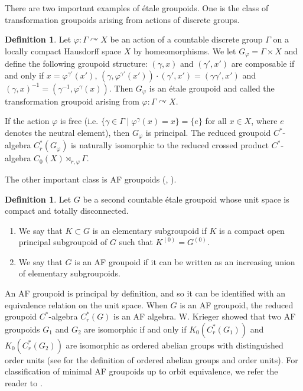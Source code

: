 \documentclass[11pt]{article}
\theoremstyle{definition}
\newtheorem{df}[thm]{Definition}
\renewcommand{\phi}{\varphi}
\begin{document}
There are two important examples of \'etale groupoids. 
One is the class of transformation groupoids 
arising from actions of discrete groups. 

\begin{df}
Let $\phi:\Gamma\curvearrowright X$ be 
an action of a countable discrete group $\Gamma$ 
on a locally compact Hausdorff space $X$ by homeomorphisms. 
We let $G_\phi=\Gamma\times X$ and define the following groupoid structure: 
$(\gamma,x)$ and $(\gamma',x')$ are composable 
if and only if $x=\phi^{\gamma'}(x')$, 
$(\gamma,\phi^{\gamma'}(x'))\cdot(\gamma',x')=(\gamma\gamma',x')$ and 
$(\gamma,x)^{-1}=(\gamma^{-1},\phi^\gamma(x))$. 
Then $G_\phi$ is an \'etale groupoid and 
called the transformation groupoid 
arising from $\phi:\Gamma\curvearrowright X$. 
\end{df}

If the action $\phi$ is free 
(i.e. $\{\gamma\in\Gamma\mid\phi^\gamma(x){=}x\}=\{e\}$ for all $x\in X$, 
where $e$ denotes the neutral element), then 
$G_\phi$ is principal. 
The reduced groupoid $C^*$-algebra $C^*_r(G_\phi)$ is naturally 
isomorphic to the reduced crossed product $C^*$-algebra 
$C_0(X)\rtimes_{r,\phi}\Gamma$. 

The other important class is AF groupoids 
(\cite[Definition III.1.1]{R1}, \cite[Definition 3.7]{GPS3}). 

\begin{df}
Let $G$ be a second countable \'etale groupoid 
whose unit space is compact and totally disconnected. 
\begin{enumerate}
\item We say that $K\subset G$ is an elementary subgroupoid 
if $K$ is a compact open principal subgroupoid of $G$ 
such that $K^{(0)}=G^{(0)}$. 
\item We say that $G$ is an AF groupoid 
if it can be written as an increasing union of elementary subgroupoids. 
\end{enumerate}
\end{df}

An AF groupoid is principal by definition, and so 
it can be identified with an equivalence relation on the unit space. 
When $G$ is an AF groupoid, 
the reduced groupoid $C^*$-algebra $C^*_r(G)$ is an AF algebra. 
W. Krieger \cite{Kr} showed that 
two AF groupoids $G_1$ and $G_2$ are isomorphic if and only if 
$K_0(C^*_r(G_1))$ and $K_0(C^*_r(G_2))$ are isomorphic 
as ordered abelian groups with distinguished order units 
(see \cite[Definition 1.1.8]{Ro} 
for the definition of ordered abelian groups and order units). 
For classification of minimal AF groupoids up to orbit equivalence, 
we refer the reader to \cite{GPS1,GPS3}. 
\end{document}
